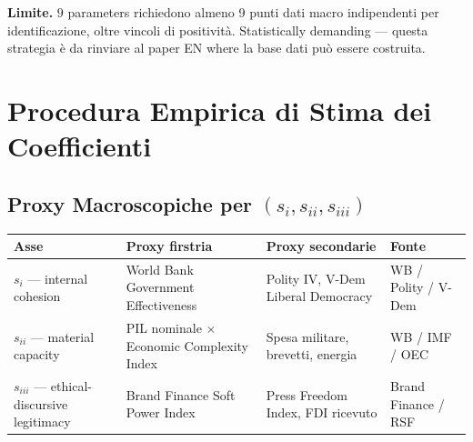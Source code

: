 \Conj{} \textbf{Limite.} \(9\) parameters richiedono almeno 9 punti dati
macro indipendenti per identificazione, oltre vincoli di positività.
Statistically demanding --- questa strategia è da rinviare al paper EN
where la base dati può essere costruita.



\section{Procedura Empirica di Stima dei
Coefficienti}\label{procedura-empirica-di-stima-dei-coefficienti}

\subsection{\texorpdfstring{Proxy Macroscopiche per
\((s_i, s_{ii}, s_{iii})\)}{Proxy Macroscopiche per (s\_i, s\_\{ii\}, s\_\{iii\})}}\label{proxy-macroscopiche-per-s_i-s_ii-s_iii}

{\def\LTcaptype{none} %
{\small\begin{longtable}[]{@{}
  >{\raggedright\arraybackslash}p{}
  >{\raggedright\arraybackslash}p{}
  >{\raggedright\arraybackslash}p{}
  >{\raggedright\arraybackslash}p{}@{}}
\toprule\noalign{}
\begin{minipage}[b]{\linewidth}\raggedright
Asse
\end{minipage} & \begin{minipage}[b]{\linewidth}\raggedright
Proxy firstria
\end{minipage} & \begin{minipage}[b]{\linewidth}\raggedright
Proxy secondarie
\end{minipage} & \begin{minipage}[b]{\linewidth}\raggedright
Fonte
\end{minipage} \\
\midrule\noalign{}
\endhead
\bottomrule\noalign{}
\endlastfoot
\(s_i\) --- internal cohesion & World Bank Government Effectiveness &
Polity IV, V-Dem Liberal Democracy & WB / Polity / V-Dem \\
\(s_{ii}\) --- material capacity & PIL nominale $\times$ Economic Complexity
Index & Spesa militare, brevetti, energia & WB / IMF / OEC \\
\(s_{iii}\) --- ethical-discursive legitimacy & Brand Finance Soft Power
Index & Press Freedom Index, FDI ricevuto & Brand Finance / RSF \\
\end{longtable}}
}

